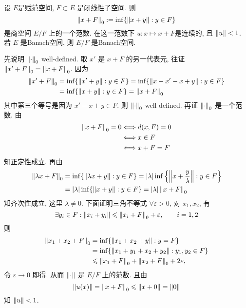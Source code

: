     \begin{Theorem}
        设 $ E $是赋范空间, $ F\subset E $ 是闭线性子空间. 则
        \[
            \left\| x+F \right\|_0:=\inf\{ \left\| x+y \right\| : y\in F \}
        \]
        是商空间 $ E/F $ 上的一个范数. 在这一范数下 $ u : x\mapsto x+F $是连续的, 且 $ \left\| u \right\|<1 $. 若 $ E $ 是Banach空间, 则 $ E/F $ 是Banach空间.
    \end{Theorem}
    \begin{Proof}
        先说明 $ \left\| \cdot \right\|_{0} $ well-defined. 取 $ x' $ 是 $ x+F $ 的另一代表元, 往证 $ \left\| x'+F \right\|_{0}=\left\| x+F \right\|_{0} $. 因为
        \[
            \begin{aligned}
                \left\| x'+F \right\|_{0} & =\inf\{ \left\| x'+y \right\|:y\in F \}  = \inf\{ \left\| x+x'-x+y \right\|: y\in F \} \\
                 & =\inf\{ \left\| x+y \right\|: y\in F \}=\left\| x+F \right\|_{0}
            \end{aligned}
        \]
        其中第三个等号是因为 $ x'-x+y\in F $. 则 $ \left\| \cdot \right\|_{0} $ well-defined. 再证 $ \left\| \cdot \right\|_{0} $ 是一个范数. 由
        \[
            \begin{aligned}
                \left\| x+F \right\|_{0}=0 & \Longleftrightarrow d(x, F)=0\\
                &  \Longleftrightarrow x\in F\\
                & \Longleftrightarrow x+F=F
            \end{aligned}
        \]
        知正定性成立. 再由
        \[
            \begin{aligned}
                \left\| \lambda x+F \right\|_{0} & =\inf\{ \left\| \lambda x+y \right\|: y\in F \}=\left| \lambda \right| \inf\left\{ \left\| x+\frac{y}{\lambda} \right\|: y\in F \right\}\\
                & =\left| \lambda \right| \inf\{ \left\| x+y \right\|: y\in F \}=\left| \lambda \right| \left\| x+F \right\|_{0}
            \end{aligned}
        \]
        知齐次性成立, 这里 $ \lambda\neq0 $. 下面证明三角不等式 $ \forall\varepsilon>0 $, 对 $ x_{1}, x_{2} $, 有
        \[
            \exists y_{i}\in F : \left\| x_{i}+y_{i} \right\|\leqslant\left\| x_{i}+F \right\|_{0}+\varepsilon, \qquad i=1, 2
        \]
        则
        \[
            \begin{aligned}
                \left\| x_{1}+x_{2}+F \right\|_{0} & =\inf\{ \left\| x_{1}+x_{2}+y \right\|: y=F \}\\
                & =\inf\{ \left\| x_{1}+y_{1}+x_{2}+y_{2} \right\|: y_{1}, y_{2}\in F \}\\
                & \leqslant \left\| x_{1}+F \right\|_{0}+\left\| x_{2}+F \right\|_{0}+2\varepsilon,
            \end{aligned}
        \]
        令 $ \varepsilon\to 0 $ 即得. 从而 $ \left\| \cdot \right\| $ 是 $ E/F $ 上的范数. 且由
        \[
             \left\| u(x) \right\|=\left\| x+F \right\|_{0}\leqslant \left\| x+0 \right\|=\left\| 0 \right\|
        \]
        知 $ \left\| u \right\|<1 $.


\end{Proof}
